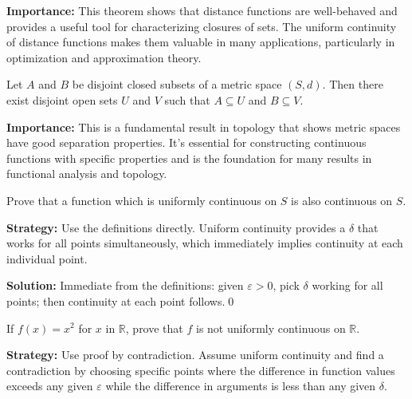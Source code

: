 \noindent\textbf{Importance:} This theorem shows that distance functions are well-behaved and provides a useful tool for characterizing closures of sets. The uniform continuity of distance functions makes them valuable in many applications, particularly in optimization and approximation theory.



\begin{theorem}
Let $A$ and $B$ be disjoint closed subsets of a metric space $(S,d)$. Then there exist disjoint open sets $U$ and $V$ such that $A \subseteq U$ and $B \subseteq V$.
\end{theorem}

\noindent\textbf{Importance:} This is a fundamental result in topology that shows metric spaces have good separation properties. It's essential for constructing continuous functions with specific properties and is the foundation for many results in functional analysis and topology.





\begin{problembox}
\begin{problemstatement}
Prove that a function which is uniformly continuous on $S$ is also continuous on $S$.
\end{problemstatement}
\end{problembox}

\noindent\textbf{Strategy:} Use the definitions directly. Uniform continuity provides a $\delta$ that works for all points simultaneously, which immediately implies continuity at each individual point.

\bigskip\noindent\textbf{Solution:}
Immediate from the definitions: given $\varepsilon>0$, pick $\delta$ working for all points; then continuity at each point follows.\qed



\begin{problembox}
\begin{problemstatement}
If $f(x) = x^2$ for $x$ in $\mathbb{R}$, prove that $f$ is not uniformly continuous on $\mathbb{R}$.
\end{problemstatement}
\end{problembox}

\noindent\textbf{Strategy:} Use proof by contradiction. Assume uniform continuity and find a contradiction by choosing specific points where the difference in function values exceeds any given $\varepsilon$ while the difference in arguments is less than any given $\delta$.

